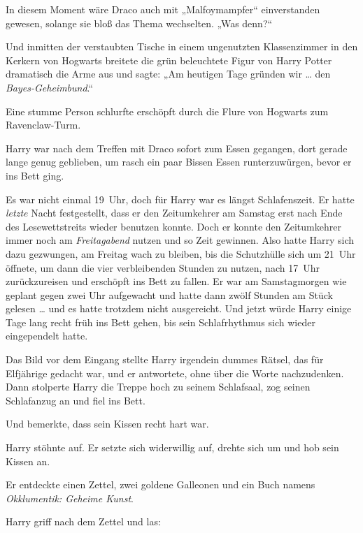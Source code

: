 In diesem Moment wäre Draco auch mit „Malfoymampfer“ einverstanden gewesen, solange sie bloß das Thema wechselten. „Was denn?“ 

Und inmitten der verstaubten Tische in einem ungenutzten Klassenzimmer in den Kerkern von Hogwarts breitete die grün beleuchtete Figur von Harry Potter dramatisch die Arme aus und sagte: „Am heutigen Tage gründen wir … den \emph{Bayes-Geheimbund}.“ 

\later 

Eine stumme Person schlurfte erschöpft durch die Flure von Hogwarts zum Ravenclaw-Turm. 

Harry war nach dem Treffen mit Draco sofort zum Essen gegangen, dort gerade lange genug geblieben, um rasch ein paar Bissen Essen runterzuwürgen, bevor er ins Bett ging. 

Es war nicht einmal 19~Uhr, doch für Harry war es längst Schlafenszeit. Er hatte \emph{letzte} Nacht festgestellt, dass er den Zeitumkehrer am Samstag erst nach Ende des Lesewettstreits wieder benutzen konnte. Doch er konnte den Zeitumkehrer immer noch am \emph{Freitagabend} nutzen und so Zeit gewinnen. Also hatte Harry sich dazu gezwungen, am Freitag wach zu bleiben, bis die Schutzhülle sich um 21~Uhr öffnete, um dann die vier verbleibenden Stunden zu nutzen, nach 17~Uhr zurückzureisen und erschöpft ins Bett zu fallen. Er war am Samstagmorgen wie geplant gegen zwei Uhr aufgewacht und hatte dann zwölf Stunden am Stück gelesen … und es hatte trotzdem nicht ausgereicht. Und jetzt würde Harry einige Tage lang recht früh ins Bett gehen, bis sein Schlafrhythmus sich wieder eingependelt hatte. 

Das Bild vor dem Eingang stellte Harry irgendein dummes Rätsel, das für Elfjährige gedacht war, und er antwortete, ohne über die Worte nachzudenken. Dann stolperte Harry die Treppe hoch zu seinem Schlafsaal, zog seinen Schlafanzug an und fiel ins Bett. 

Und bemerkte, dass sein Kissen recht hart war. 

Harry stöhnte auf. Er setzte sich widerwillig auf, drehte sich um und hob sein Kissen an. 

Er entdeckte einen Zettel, zwei goldene Galleonen und ein Buch namens \emph{Okklumentik: Geheime Kunst}. 

Harry griff nach dem Zettel und las: 

